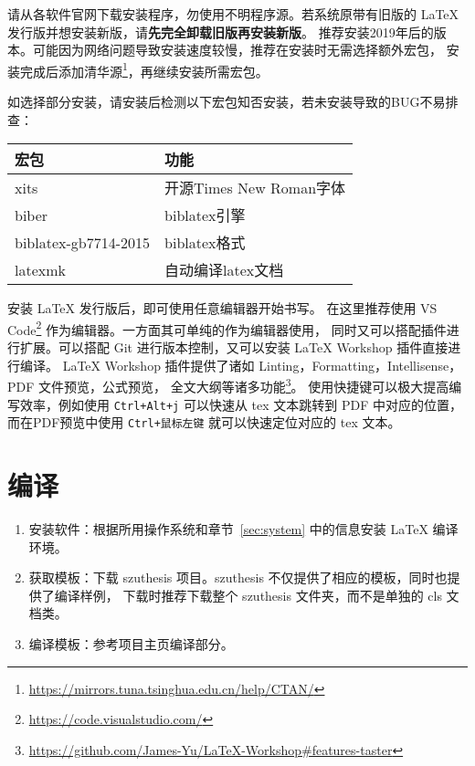 请从各软件官网下载安装程序，勿使用不明程序源。若系统原带有旧版的 \LaTeX{} 发行版并想安装新版，请\textbf{先完全卸载旧版再安装新版}。
推荐安装2019年后的版本。可能因为网络问题导致安装速度较慢，推荐在安装时无需选择额外宏包，
安装完成后添加清华源\footnote{\url{https://mirrors.tuna.tsinghua.edu.cn/help/CTAN/}}，再继续安装所需宏包。

如选择部分安装，请安装后检测以下宏包知否安装，若未安装导致的BUG不易排查：

\begin{center}
    \small%
    \renewcommand{\arraystretch}{0.8}%
    \begin{tabular}{ll}
        \toprule
        宏包                 & 功能                    \\
        \midrule
        xits                 & 开源Times New Roman字体 \\
        biber                & biblatex引擎            \\
        biblatex-gb7714-2015 & biblatex格式            \\
        latexmk              & 自动编译latex文档       \\
        \bottomrule
    \end{tabular}
\end{center}

安装 \LaTeX{} 发行版后，即可使用任意编辑器开始书写。
在这里推荐使用 VS Code\footnote{\url{https://code.visualstudio.com/}} 作为编辑器。一方面其可单纯的作为编辑器使用，
同时又可以搭配插件进行扩展。可以搭配 Git 进行版本控制，又可以安装 LaTeX Workshop 插件直接进行编译。
LaTeX Workshop 插件提供了诸如 Linting，Formatting，Intellisense，PDF 文件预览，公式预览，
全文大纲等诸多功能\footnote{\url{https://github.com/James-Yu/LaTeX-Workshop\#features-taster}}。
使用快捷键可以极大提高编写效率，例如使用 \lstinline!Ctrl+Alt+j! 可以快速从 tex 文本跳转到 PDF 中对应的位置，
而在PDF预览中使用 \lstinline!Ctrl+鼠标左键! 就可以快速定位对应的 tex 文本。


\section{编译}

\begin{enumerate}[wide=\parindent]
    \item 安装软件：根据所用操作系统和章节~\ref{sec:system} 中的信息安装 \LaTeX{} 编译环境。

    \item 获取模板：下载 szuthesis 项目。szuthesis 不仅提供了相应的模板，同时也提供了编译样例，
          下载时推荐下载整个 szuthesis 文件夹，而不是单独的 cls 文档类。

    \item 编译模板：参考项目主页编译部分。
\end{enumerate}

